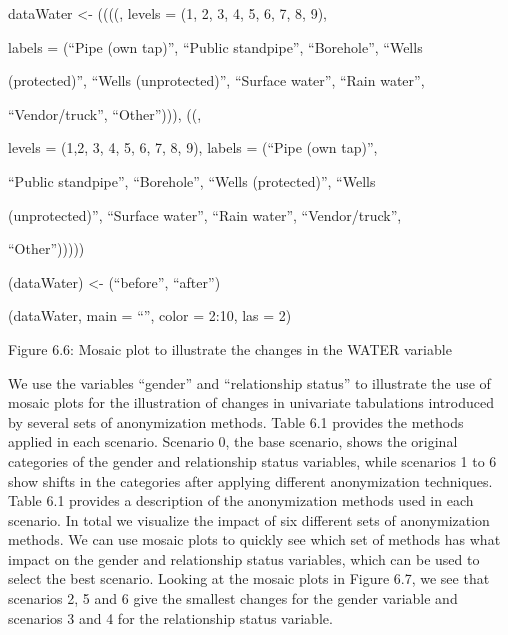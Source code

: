 \documentclass[letterpaper,10pt,english]{sphinxmanual}
\begin{document}
\begin{DUlineblock}{0em}
\item[] 
\item[] dataWater \textless{}-
((((,
levels = (1, 2, 3, 4, 5, 6, 7, 8, 9),
\item[] labels = (“Pipe (own tap)”, “Public standpipe”, “Borehole”,
“Wells
\item[] (protected)”, “Wells (unprotected)”, “Surface water”, “Rain water”,
\item[] “Vendor/truck”, “Other”))),
((,
\item[] levels = (1,2, 3, 4, 5, 6, 7, 8, 9), labels = (“Pipe
(own tap)”,
\item[] “Public standpipe”, “Borehole”, “Wells (protected)”, “Wells
\item[] (unprotected)”, “Surface water”, “Rain water”, “Vendor/truck”,
\item[] “Other”)))))
\end{DUlineblock}

(dataWater) \textless{}- (“before”, “after”)

\begin{DUlineblock}{0em}
\item[] 
\item[] (dataWater, main = “”, color = 2:10, las = 2)
\end{DUlineblock}

\noindent{}

Figure 6.6: Mosaic plot to illustrate the changes in the WATER variable

We use the variables “gender” and “relationship status” to illustrate
the use of mosaic plots for the illustration of changes in univariate
tabulations introduced by several sets of anonymization methods. Table
6.1 provides the methods applied in each scenario. Scenario 0, the base
scenario, shows the original categories of the gender and relationship
status variables, while scenarios 1 to 6 show shifts in the categories
after applying different anonymization techniques. Table 6.1 provides a
description of the anonymization methods used in each scenario. In total
we visualize the impact of six different sets of anonymization methods.
We can use mosaic plots to quickly see which set of methods has what
impact on the gender and relationship status variables, which can be
used to select the best scenario. Looking at the mosaic plots in Figure
6.7, we see that scenarios 2, 5 and 6 give the smallest changes for the
gender variable and scenarios 3 and 4 for the relationship status
variable.
\end{document}

